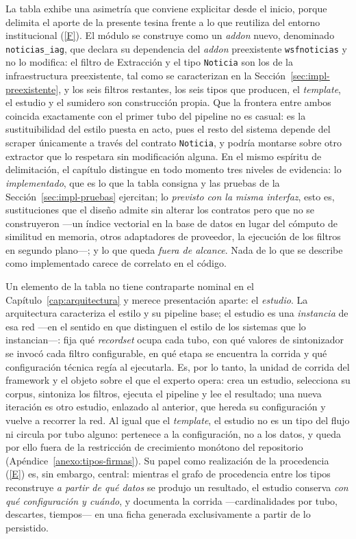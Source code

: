 \documentclass[12pt]{report}
\DeclareRobustCommand{\resp}[1]{\hyperref[tab:registro-responsabilidades]{\textcolor{respcolor}{[#1]}}}
\begin{document}
La tabla exhibe una asimetría que conviene explicitar desde el inicio, porque delimita el aporte de la presente tesina frente a lo que reutiliza del entorno institucional (\resp{F}). El módulo se construye como un \textit{addon} nuevo, denominado \texttt{noticias\_iag}, que declara su dependencia del \textit{addon} preexistente \texttt{wsfnoticias} y no lo modifica: el filtro de Extracción y el tipo \texttt{Noticia} son los de la infraestructura preexistente, tal como se caracterizan en la Sección~\ref{sec:impl-preexistente}, y los seis filtros restantes, los seis tipos que producen, el \textit{template}, el estudio y el sumidero son construcción propia. Que la frontera entre ambos coincida exactamente con el primer tubo del pipeline no es casual: es la sustituibilidad del estilo puesta en acto, pues el resto del sistema depende del scraper únicamente a través del contrato \texttt{Noticia}, y podría montarse sobre otro extractor que lo respetara sin modificación alguna. En el mismo espíritu de delimitación, el capítulo distingue en todo momento tres niveles de evidencia: lo \textit{implementado}, que es lo que la tabla consigna y las pruebas de la Sección~\ref{sec:impl-pruebas} ejercitan; lo \textit{previsto con la misma interfaz}, esto es, sustituciones que el diseño admite sin alterar los contratos pero que no se construyeron ---un índice vectorial en la base de datos en lugar del cómputo de similitud en memoria, otros adaptadores de proveedor, la ejecución de los filtros en segundo plano---; y lo que queda \textit{fuera de alcance}. Nada de lo que se describe como implementado carece de correlato en el código.

Un elemento de la tabla no tiene contraparte nominal en el Capítulo~\ref{cap:arquitectura} y merece presentación aparte: el \textit{estudio}. La arquitectura caracteriza el estilo y su pipeline base; el estudio es una \textit{instancia} de esa red ---en el sentido en que \citet{garlanshaw:1994} distinguen el estilo de los sistemas que lo instancian---: fija qué \textit{recordset} ocupa cada tubo, con qué valores de sintonizador se invocó cada filtro configurable, en qué etapa se encuentra la corrida y qué configuración técnica regía al ejecutarla. Es, por lo tanto, la unidad de corrida del framework y el objeto sobre el que el experto opera: crea un estudio, selecciona su corpus, sintoniza los filtros, ejecuta el pipeline y lee el resultado; una nueva iteración es otro estudio, enlazado al anterior, que hereda su configuración y vuelve a recorrer la red. Al igual que el \textit{template}, el estudio no es un tipo del flujo ni circula por tubo alguno: pertenece a la configuración, no a los datos, y queda por ello fuera de la restricción de crecimiento monótono del repositorio (Apéndice~\ref{anexo:tipos-firmas}). Su papel como realización de la procedencia (\resp{E}) es, sin embargo, central: mientras el grafo de procedencia entre los tipos reconstruye \textit{a partir de qué datos} se produjo un resultado, el estudio conserva \textit{con qué configuración y cuándo}, y documenta la corrida ---cardinalidades por tubo, descartes, tiempos--- en una ficha generada exclusivamente a partir de lo persistido.
\end{document}
